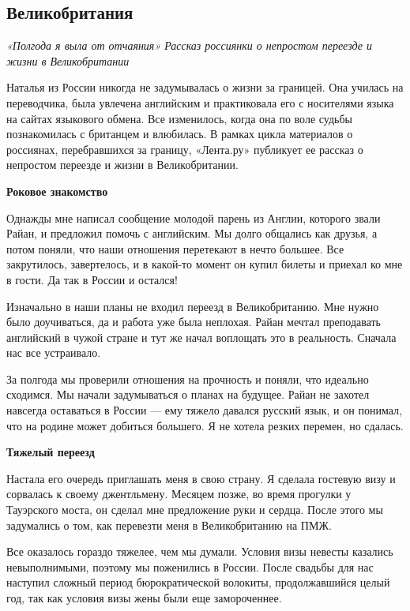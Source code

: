 \newpage
\subsection{Великобритания}

\textit{«Полгода я выла от отчаяния» Рассказ россиянки о непростом переезде и жизни в Великобритании }

Наталья из России никогда не задумывалась о жизни за границей. Она училась на переводчика, была увлечена английским и практиковала его с носителями языка на сайтах языкового обмена. Все изменилось, когда она по воле судьбы познакомилась с британцем и влюбилась. В рамках цикла материалов о россиянах, перебравшихся за границу, «Лента.ру» публикует ее рассказ о непростом переезде и жизни в Великобритании.

\textbf{Роковое знакомство}

Однажды мне написал сообщение молодой парень из Англии, которого звали Райан, и предложил помочь с английским. Мы долго общались как друзья, а потом поняли, что наши отношения перетекают в нечто большее. Все закрутилось, завертелось, и в какой-то момент он купил билеты и приехал ко мне в гости. Да так в России и остался!

Изначально в наши планы не входил переезд в Великобританию. Мне нужно было доучиваться, да и работа уже была неплохая. Райан мечтал преподавать английский в чужой стране и тут же начал воплощать это в реальность. Сначала нас все устраивало.

За полгода мы проверили отношения на прочность и поняли, что идеально сходимся. Мы начали задумываться о планах на будущее. Райан не захотел навсегда оставаться в России — ему тяжело давался русский язык, и он понимал, что на родине может добиться большего. Я не хотела резких перемен, но сдалась.

\textbf{Тяжелый переезд}

Настала его очередь приглашать меня в свою страну. Я сделала гостевую визу и сорвалась к своему джентльмену. Месяцем позже, во время прогулки у Тауэрского моста, он сделал мне предложение руки и сердца. После этого мы задумались о том, как перевезти меня в Великобританию на ПМЖ.

Все оказалось гораздо тяжелее, чем мы думали. Условия визы невесты казались невыполнимыми, поэтому мы поженились в России. После свадьбы для нас наступил сложный период бюрократической волокиты, продолжавшийся целый год, так как условия визы жены были еще замороченнее.

